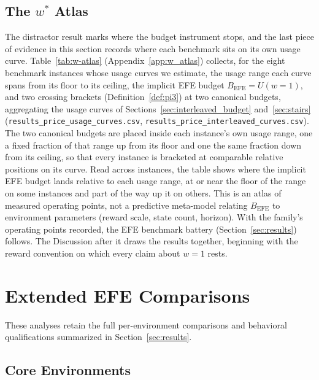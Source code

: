 \subsection{The $w^*$ Atlas}
\label{sec:w_atlas}

The distractor result marks where the budget instrument stops, and the last piece of evidence in this section records where each benchmark sits on its own usage curve. Table~\ref{tab:w-atlas} (Appendix~\ref{app:w_atlas}) collects, for the eight benchmark instances whose usage curves we estimate, the usage range each curve spans from its floor to its ceiling, the implicit EFE budget $B_{\mathrm{EFE}} = U(w{=}1)$, and two crossing brackets (Definition~\ref{def:pi3}) at two canonical budgets, aggregating the usage curves of Sections~\ref{sec:interleaved_budget} and~\ref{sec:stairs} (\texttt{results\_\allowbreak price\_\allowbreak usage\_\allowbreak curves.csv}, \texttt{results\_\allowbreak price\_\allowbreak interleaved\_\allowbreak curves.csv}). The two canonical budgets are placed inside each instance's own usage range, one a fixed fraction of that range up from its floor and one the same fraction down from its ceiling, so that every instance is bracketed at comparable relative positions on its curve. Read across instances, the table shows where the implicit EFE budget lands relative to each usage range, at or near the floor of the range on some instances and part of the way up it on others. This is an atlas of measured operating points, not a predictive meta-model relating $B_{\mathrm{EFE}}$ to environment parameters (reward scale, state count, horizon). With the family's operating points recorded, the EFE benchmark battery (Section~\ref{sec:results}) follows. The Discussion after it draws the results together, beginning with the reward convention on which every claim about $w{=}1$ rests.

\section{Extended EFE Comparisons}
\label{app:extended_efe_results}

These analyses retain the full per-environment comparisons and behavioral qualifications summarized in Section~\ref{sec:results}.

\subsection{Core Environments}
\label{app:core_details}

